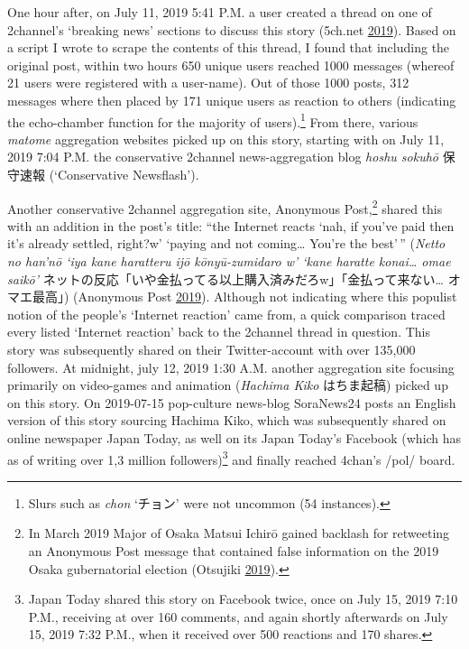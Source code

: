 \documentclass[10pt,british,A4paper,,openany]{memoir}
\begin{document}
One hour after, on July 11, 2019 5:41 P.M. a user created a thread on
one of 2channel's `breaking news' sections to discuss this story
(5ch.net \protect\hyperlink{ref-5ch.net_eng._2019}{2019}). Based on a
script I wrote to scrape the contents of this thread, I found that
including the original post, within two hours 650 unique users reached
1000 messages (whereof 21 users were registered with a user-name). Out
of those 1000 posts, 312 messages where then placed by 171 unique users
as reaction to others (indicating the echo-chamber function for the
majority of users).\footnote{Slurs such as \emph{chon} `チョン' were not
  uncommon (54 instances).} From there, various \emph{matome}
aggregation websites picked up on this story, starting with on July 11,
2019 7:04 P.M. the conservative 2channel news-aggregation blog
\emph{hoshu sokuhō} 保守速報 (`Conservative Newsflash').

Another conservative 2channel aggregation site, Anonymous
Post,\footnote{In March 2019 Major of Osaka Matsui Ichirō gained
  backlash for retweeting an Anonymous Post message that contained false
  information on the 2019 Osaka gubernatorial election (Otsujiki
  \protect\hyperlink{ref-otsujiki_eng._2019}{2019}).} shared this with
an addition in the post's title: ``the Internet reacts `nah, if you've
paid then it's already settled, right?w' `paying and not coming\ldots{}
You're the best'\,'' (\emph{Netto no han'nō `iya kane haratteru ijō
kōnyū-zumidaro w' `kane haratte konai\ldots{} omae saikō'}
ネットの反応「いや金払ってる以上購入済みだろw」「金払って来ない\ldots{}
オマエ最高」) (Anonymous Post
\protect\hyperlink{ref-anonymous_post_eng._2019}{2019}). Although not
indicating where this populist notion of the people's `Internet
reaction' came from, a quick comparison traced every listed `Internet
reaction' back to the 2channel thread in question. This story was
subsequently shared on their Twitter-account with over 135,000
followers. At midnight, july 12, 2019 1:30 A.M. another aggregation site
focusing primarily on video-games and animation (\emph{Hachima Kiko}
はちま起稿) picked up on this story. On 2019-07-15 pop-culture news-blog
SoraNews24 posts an English version of this story sourcing Hachima Kiko,
which was subsequently shared on online newspaper Japan Today, as well
on its Japan Today's Facebook (which has as of writing over 1,3 million
followers)\footnote{Japan Today shared this story on Facebook twice,
  once on July 15, 2019 7:10 P.M., receiving at over 160 comments, and
  again shortly afterwards on July 15, 2019 7:32 P.M., when it received
  over 500 reactions and 170 shares.} and finally reached 4chan's /pol/
board.
\end{document}

